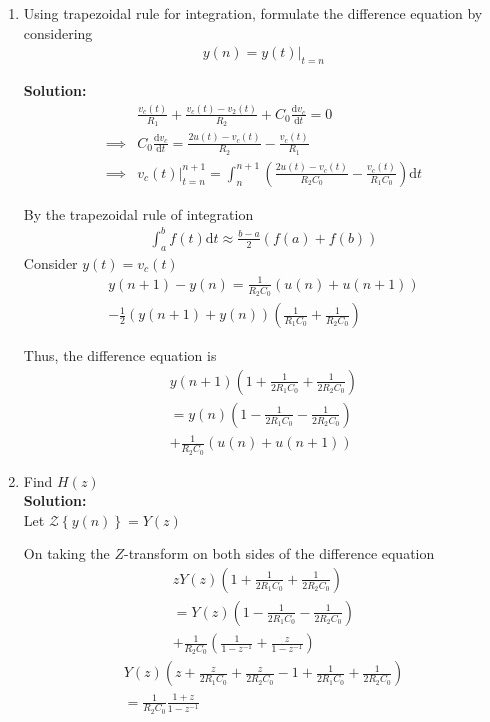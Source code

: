 \documentclass[journal,12pt,twocolumn]{IEEEtran}
\newcommand{\solution}{\noindent \textbf{Solution: }}
\providecommand{\brak}[1]{\ensuremath{\left(#1\right)}}
\providecommand{\cbrak}[1]{\ensuremath{\left\{#1\right\}}}
\providecommand{\der}[1]{\mathrm{d} #1}
\providecommand{\z}[1]{{\mathcal{Z}}\cbrak{#1}}
\numberwithin{equation}{section}
\numberwithin{figure}{section}
\renewcommand\thesection{\arabic{section}}
\begin{document}
\begin{enumerate}[label=\thesection.\arabic*,ref=\thesection.\theenumi]
		\item Using trapezoidal rule for integration, formulate the difference equation by considering 
			\begin{align}
				y(n) = y(t)\vert_{t=n}
			\end{align}

		\solution\\
			\begin{align}
				&\frac{v_c(t)}{R_1} + \frac{v_c(t) - v_2(t)}{R_2} + C_0\frac{\der{v_c}}{\der{t}} = 0 \\
				\implies &C_0\frac{\der{v_c}}{\der{t}} = \frac{2u(t)-v_c(t)}{R_2} - \frac{v_c(t)}{R_1} \\
				\implies &\left.v_c(t)\right|_{t=n}^{n+1} = \int_{n}^{n+1} \brak{\frac{2u(t)-v_c(t)}{R_2C_0} - \frac{v_c(t)}{R_1C_0}} \der{t}
			\end{align}

			By the trapezoidal rule of integration
			\begin{align} 
				\int_a^b f(t) \der{t} \approx \frac{b-a}{2} (f(a) + f(b))
			\end{align}
			Consider $y(t) = v_c(t)$
			\begin{multline}
				y(n+1) - y(n) = \frac{1}{R_2C_0}\brak{u(n)+u(n+1)} \\
				- \frac12(y(n+1) + y(n))\brak{\frac{1}{R_1C_0} + \frac{1}{R_2C_0}}
			\end{multline}
	
			Thus, the difference equation is
			\begin{multline}
				y(n+1) \brak{1 + \frac{1}{2R_1C_0} + \frac{1}{2R_2C_0}} \\= y(n) \brak{1 - \frac{1}{2R_1C_0} - \frac{1}{2R_2C_0}} \\+ \frac{1}{R_2C_0}\brak{u(n)+u(n+1)}
			\end{multline}

		\item Find $H(z)$\\
	
		\solution\\
			Let $\z{y(n)} = Y(z)$
	
			On taking the $Z$-transform on both sides of the difference equation
			\begin{multline}
				zY(z)\brak{1 + \frac{1}{2R_1C_0} + \frac{1}{2R_2C_0}} \\= Y(z)\brak{1 - \frac{1}{2R_1C_0} - \frac{1}{2R_2C_0}} \\+ \frac{1}{R_2C_0} \brak{\frac{1}{1-z^{-1}} + \frac{z}{1-z^{-1}}}
			\end{multline}
			\begin{multline}
				Y(z)\brak{z + \frac{z}{2R_1C_0} + \frac{z}{2R_2C_0} - 1 + \frac{1}{2R_1C_0} + \frac{1}{2R_2C_0}} \\
				= \frac{1}{R_2C_0} \frac{1+z}{1-z^{-1}}
			\end{multline}
	

\end{enumerate}
\end{document}
